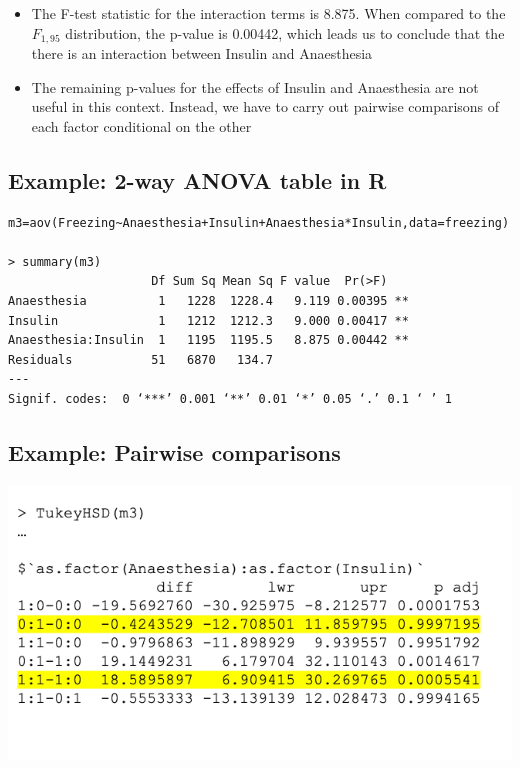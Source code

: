 \documentclass[
]{book}
\providecommand{\tightlist}{%
  \setlength{\itemsep}{0pt}\setlength{\parskip}{0pt}}
\begin{document}
\begin{itemize}
\tightlist
\item
  The F-test statistic for the interaction terms is 8.875. When compared to the \(F_{1,95}\) distribution, the p-value is 0.00442, which leads us to conclude that the there is an interaction between Insulin and Anaesthesia
\item
  The remaining p-values for the effects of Insulin and Anaesthesia are not useful in this context. Instead, we have to carry out pairwise comparisons of each factor conditional on the other
\end{itemize}

\hypertarget{example-2-way-anova-table-in-r}{%
\subsection{Example: 2-way ANOVA table in R}\label{example-2-way-anova-table-in-r}}

\begin{verbatim}
m3=aov(Freezing~Anaesthesia+Insulin+Anaesthesia*Insulin,data=freezing)

> summary(m3)
                    Df Sum Sq Mean Sq F value  Pr(>F)   
Anaesthesia          1   1228  1228.4   9.119 0.00395 **
Insulin              1   1212  1212.3   9.000 0.00417 **
Anaesthesia:Insulin  1   1195  1195.5   8.875 0.00442 **
Residuals           51   6870   134.7                   
---
Signif. codes:  0 ‘***’ 0.001 ‘**’ 0.01 ‘*’ 0.05 ‘.’ 0.1 ‘ ’ 1
\end{verbatim}

\hypertarget{example-pairwise-comparisons}{%
\subsection{Example: Pairwise comparisons}\label{example-pairwise-comparisons}}

\includegraphics[width=1\linewidth]{./11_27}
\end{document}
